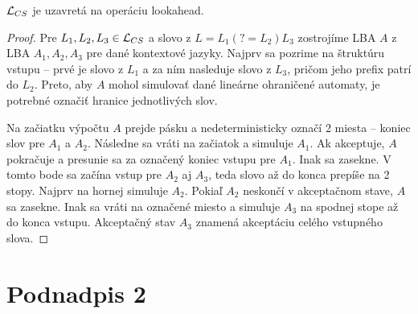 \begin{veta}
$ {\cal L}_{CS} $ je uzavretá na operáciu lookahead.
\end{veta}
\begin{proof}
Pre $ L_{1}, L_{2}, L_{3} \in {\cal L}_{CS} $ a slovo z $ L = L_{1}(?=L_{2})L_{3} $ zostrojíme LBA $A$ z LBA $A_1, A_2, A_3$ pre dané kontextové jazyky. Najprv sa pozrime na štruktúru vstupu -- prvé je slovo z $L_1$ a za ním nasleduje slovo z $L_3$, pričom jeho prefix patrí do $L_2$. Preto, aby $A$ mohol simulovať dané lineárne ohraničené automaty, je potrebné označiť hranice jednotlivých slov.

 Na začiatku výpočtu $A$ prejde pásku a nedeterministicky označí 2 miesta -- koniec slov pre $A_1$ a $A_2$. Následne sa vráti na začiatok a simuluje $A_1$. Ak akceptuje, $A$ pokračuje a presunie sa za označený koniec vstupu pre $A_1$. Inak sa zasekne. V tomto bode sa začína vstup pre $A_2$ aj $A_3$, teda slovo až do konca prepíše na 2 stopy. Najprv na hornej simuluje $A_2$. Pokiaľ $A_2$ neskončí v akceptačnom stave, $A$ sa zasekne. Inak sa vráti na označené miesto a simuluje $A_3$ na spodnej stope až do konca vstupu. Akceptačný stav $A_3$ znamená akceptáciu celého vstupného slova.
\end{proof}

\section{Podnadpis 2}\label{chap:podkapitola2}

